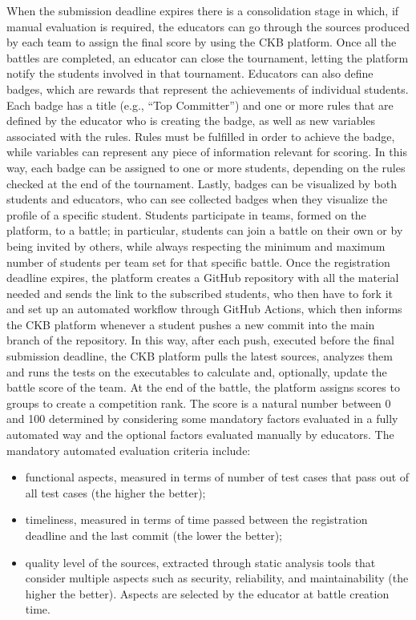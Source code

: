 \documentclass[12pt,oneside,a4paper]{article}
\begin{document}
When the submission deadline expires there is a consolidation stage in which, if manual evaluation is required, the educators can go through the sources produced by each team to assign the final score by using the CKB platform. Once all the battles are completed, an educator can close the tournament, letting the platform notify the students involved in that tournament.
Educators can also define badges, which are rewards that represent the achievements of individual students. Each badge has a title (e.g., “Top Committer”) and one or more rules that are defined by the educator who is creating the badge, as well as new variables associated with the rules. Rules must be fulfilled in order to achieve the badge, while variables can represent any piece of information relevant for scoring. In this way, each badge can be assigned to one or more students, depending on the rules checked at the end of the tournament. Lastly, badges can be visualized by both students and educators, who can see collected badges when they visualize the profile of a specific student.
Students participate in teams, formed on the platform, to a battle; in particular, students can join a battle on their own or by being invited by others, while always respecting the minimum and maximum number of students per team set for that specific battle. Once the registration deadline expires, the platform creates a GitHub repository with all the material needed and sends the link to the subscribed students, who then have to fork it and set up an automated workflow through GitHub Actions, which then informs the CKB platform whenever a student pushes a new commit into the main branch of the repository. In this way, after each push, executed before the final submission deadline, the CKB platform pulls the latest sources, analyzes them and runs the tests on the executables to calculate and, optionally, update the battle score of the team.
At the end of the battle, the platform assigns scores to groups to create a competition rank. The score is a natural number between 0 and 100 determined by considering some mandatory factors evaluated in a fully automated way and the optional factors evaluated manually by educators. The mandatory automated evaluation criteria include:
\begin{itemize}
    \item functional aspects, measured in terms of number of test cases that pass out of all test cases (the higher the better);
    \item timeliness, measured in terms of time passed between the registration deadline and the last commit (the lower the better); 
    \item quality level of the sources, extracted through static analysis tools that consider multiple aspects such as security, reliability, and maintainability (the higher the better). Aspects are selected by the educator at battle creation time.
\end{itemize}
\end{document}
